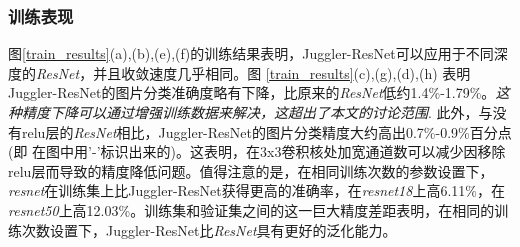 \subsubsection{训练表现}
图\ref{train_results}(a),(b),(e),(f)的训练结果表明，Juggler-ResNet可以应用于不同深度的\emph{ResNet}，并且收敛速度几乎相同。图 \ref{train_results}(c),(g),(d),(h) 表明Juggler-ResNet的图片分类准确度略有下降，比原来的\emph{ResNet}低约1.4\%-1.79\%。\emph{这种精度下降可以通过增强训练数据来解决，这超出了本文的讨论范围}. 此外，与没有relu层的\emph{ResNet}相比，Juggler-ResNet的图片分类精度大约高出0.7\%-0.9\%百分点(即 在图中用'-'标识出来的)。这表明，在3x3卷积核处加宽通道数可以减少因移除relu层而导致的精度降低问题。值得注意的是，在相同训练次数的参数设置下，\emph{resnet}在训练集上比Juggler-ResNet获得更高的准确率，在\emph{resnet18}上高6.11\%，在\emph{resnet50}上高12.03\%。训练集和验证集之间的这一巨大精度差距表明，在相同的训练次数设置下，Juggler-ResNet比\emph{ResNet}具有更好的泛化能力。

